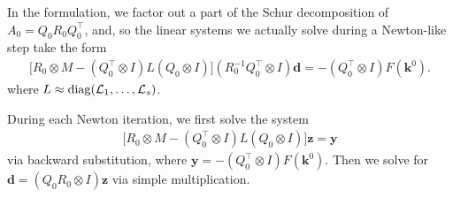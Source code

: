\documentclass[review]{siamart}
\begin{document}
In the formulation, we factor out a part of the Schur decomposition of $A_0 = Q_0 R_0 Q_0^\top$, and, so the linear systems we actually solve during a Newton-like step take the form
\begin{align}
\big[ R_0 \otimes M - (Q_0^\top \otimes  I) L (Q_0 \otimes I) \big] 
(R_0^{-1} Q_0^\top \otimes I) \bm{d} = - (Q_0^\top \otimes I) F( \bm{k}^0).
\end{align}
where $L \approx {\rm diag}({\cal L}_1, \ldots, {\cal L}_s)$.

During each Newton iteration, we first solve the system
\begin{align}
\big[ R_0 \otimes M - (Q_0^\top \otimes  I) L (Q_0 \otimes I) \big]  \bm{z} = \bm{y}
\end{align}
via backward substitution, where $ \bm{y} = - (Q_0^\top \otimes I) F( \bm{k}^0)$. Then we solve for $\bm{d} = (Q_0 R_0 \otimes I) \bm{z}$ via simple multiplication.
\end{document}
